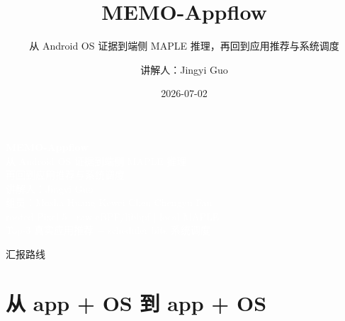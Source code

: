 \documentclass[UTF8,aspectratio=169,10pt]{ctexbeamer}
\title[MEMO-Appflow]{MEMO-Appflow}
\subtitle{从 Android OS 证据到端侧 MAPLE 推理，再回到应用推荐与系统调度}
\author{讲解人：Jingyi Guo}
\date{2026-07-02}
\begin{document}
{
\begin{frame}[plain]
  \vspace{2.0em}
  \begin{center}
    {\Huge\bfseries\textcolor{white}{MEMO-Appflow}}\\[1.2em]
    {\Large\textcolor{white}{从 Android OS 证据到端侧 MAPLE 推理}}\\[0.4em]
    {\Large\textcolor{white}{再回到应用推荐与系统调度}}\\[2.0em]
    {\normalsize\textcolor{white}{讲解人：Jingyi Guo}}\\[0.5em]
    {\small\textcolor{white}{组员：Mosha Huang \quad Kewei Chen \quad Chengyu Fan}}\\[0.8em]
    {\small\textcolor{white}{rooted Pixel 5 \quad | \quad raw eBPF/libbpf \quad | \quad local MAPLE}}\\[0.3em]
    {\small\textcolor{white}{Top-3 真实应用推荐 + scheduler bits 系统调度}}
  \end{center}
\end{frame}
}

\begin{frame}{汇报路线}
  \tableofcontents
\end{frame}

\section{从 app + OS 到 app + OS}
\end{document}
